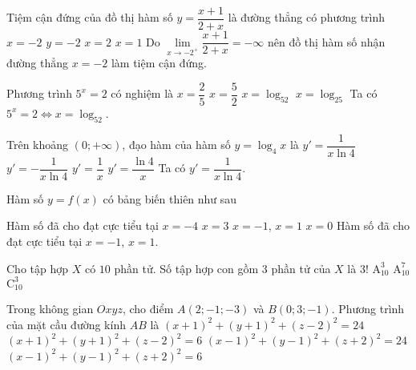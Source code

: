 \begin{ex}%
Tiệm cận đứng của đồ thị hàm số $y=\dfrac{x+1}{2+x}$ là đường thẳng có phương trình 
		\choice
		{\True $x=-2$}
		{$y=-2$}
		{$x=2$}
		{$x=1$}
	\loigiai
	{
		Do $\lim\limits_{x\to -2^+}\dfrac{x+1}{2+x}=-\infty$ nên đồ thị hàm số nhận đường thẳng $x=-2$ làm tiệm cận đứng.
	} 
\end{ex}
\begin{ex}%
Phương trình $5^x=2$ có nghiệm là
		\choice
		{$x=\dfrac{2}{5}$}
		{$x=\dfrac{5}{2}$}
		{\True $x=\log_52$}
		{$x=\log_25$}
	\loigiai
	{
		Ta có $5^x=2\Leftrightarrow x=\log_52$.
	}
\end{ex}
\begin{ex}%
	Trên khoảng $(0;+\infty)$, đạo hàm của hàm số $y=\log_4x$ là
	\choice
	{\True $y'=\dfrac{1}{x\ln 4}$}
	{$y'=-\dfrac{1}{x\ln 4}$}
	{$y'=\dfrac{1}{x}$}
	{$y'=\dfrac{\ln 4}{x}$}
	\loigiai
	{
		Ta có $y'=\dfrac{1}{x\ln 4}$.
	}
\end{ex}
\begin{ex}%
	Hàm số $y=f(x)$ có bảng biến thiên như sau
	\begin{center}
	\end{center}
Hàm số đã cho đạt cực tiểu tại
		\choice
		{$x=-4$}
		{$x=3$}
		{\True $x=-1$, $x=1$}
		{$x=0$}
	\loigiai
	{
		Hàm số đã cho đạt cực tiểu tại $x=-1$, $x=1$.
	}
\end{ex}
\begin{ex}%
Cho tập hợp $X$ có $10$ phần tử. Số tập hợp con gồm $3$ phần tử của $X$ là
	\choice
	{$3!$}
	{$\mathrm{A}_{10}^3$}
	{$\mathrm{A}_{10}^7$}
	{\True $\mathrm{C}_{10}^3$}
\end{ex}
\begin{ex}%
	Trong không gian $Oxyz$, cho điểm $A(2;-1;-3)$ và $B(0;3;-1)$. Phương trình của mặt cầu đường kính $AB$ là
	\choice
	{$(x+1)^2+(y+1)^2+(z-2)^2=24$}
	{$(x+1)^2+(y+1)^2+(z-2)^2=6$}
	{$(x-1)^2+(y-1)^2+(z+2)^2=24$}
	{\True $(x-1)^2+(y-1)^2+(z+2)^2=6$}
\end{ex}
